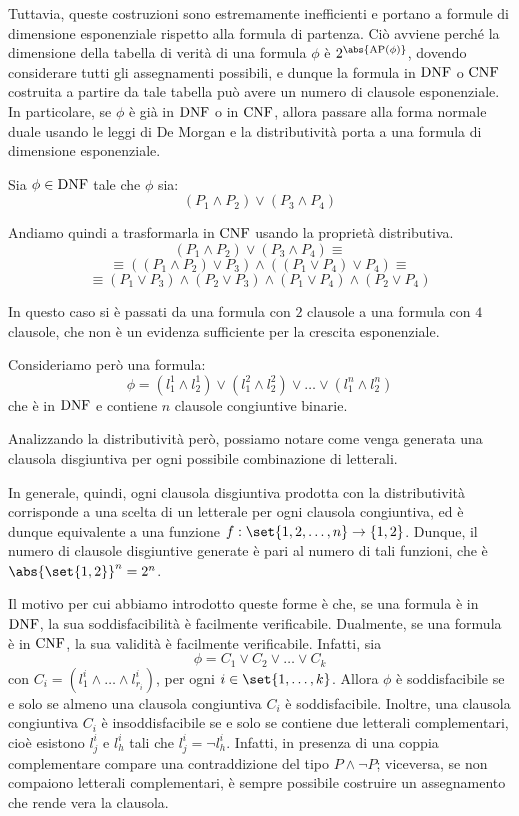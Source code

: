 Tuttavia, queste costruzioni sono estremamente inefficienti e portano a formule di dimensione esponenziale rispetto alla formula di partenza. 
Ciò avviene perché la dimensione della tabella di verità di una formula \(\phi\) è \(2^{\abs{\AP[\phi]}}\), dovendo considerare tutti gli assegnamenti possibili, e dunque la formula in \(\operatorname{DNF}\) o \(\operatorname{CNF}\) costruita a partire da tale tabella può avere un numero di clausole esponenziale. 
In particolare, se \(\phi\) è già in \(\operatorname{DNF}\) o in \(\operatorname{CNF}\), allora passare alla forma normale duale usando le leggi di De Morgan e la distributività porta a una formula di dimensione esponenziale.

\begin{example}{}
  Sia \(\phi \in\operatorname{DNF}\) tale che \(\phi\) sia:
  \[(P_1 \land P_2)\lor (P_3 \land P_4)\]

  Andiamo quindi a trasformarla in \(\operatorname{CNF}\) usando la proprietà distributiva.
  \[(P_1 \land P_2)\lor (P_3 \land P_4)\equiv\]
  \[\equiv ((P_1 \land P_2)\lor P_3)\land((P_1 \lor P_4)\lor P_4)\equiv\]
  \[\equiv (P_1 \lor P_3) \land (P_2 \lor P_3) \land (P_1 \lor P_4) \land (P_2 \lor P_4)\]

  In questo caso si è passati da una formula con \(2\) clausole a una formula con \(4\) clausole, che non è un evidenza sufficiente per la crescita esponenziale.

  Consideriamo però una formula:
  \[\phi = (l_1^1 \land l_2^1) \lor (l_1^2 \land l_2^2) \lor\ldots\lor (l_1^n \land l_2^n)\]
  che è in \(\operatorname{DNF}\) e contiene \(n\) clausole congiuntive binarie.

  Analizzando la distributività però, possiamo notare come venga generata una clausola disgiuntiva per ogni possibile combinazione di letterali.

  In generale, quindi, ogni clausola disgiuntiva prodotta con la distributività corrisponde a una scelta di un letterale per ogni clausola congiuntiva, ed è dunque equivalente a una funzione \(f:\set{1,2,\ldots,n} \to \{1,2\}\). Dunque, il numero di clausole disgiuntive generate è pari al numero di tali funzioni, che è \(\abs{\set{1,2}}^n = 2^n\).
\end{example}

Il motivo per cui abbiamo introdotto queste forme è che, se una formula è in \(\operatorname{DNF}\), la sua soddisfacibilità è facilmente verificabile. 
Dualmente, se una formula è in \(\operatorname{CNF}\), la sua validità è facilmente verificabile.
Infatti, sia
\[\phi = C_1 \lor C_2 \lor \ldots \lor C_k\]
con \(C_i = (l_1^i \land \ldots \land l_{r_i}^i)\), per ogni \(i \in \set{1,\ldots,k}\).
Allora \(\phi\) è soddisfacibile se e solo se almeno una clausola congiuntiva \(C_i\) è soddisfacibile.
Inoltre, una clausola congiuntiva \(C_i\) è insoddisfacibile se e solo se contiene due letterali complementari, cioè esistono \(l_j^i\) e \(l_h^i\) tali che \(l_j^i = \neg l_h^i\).
Infatti, in presenza di una coppia complementare compare una contraddizione del tipo \(P \land \neg P\); viceversa, se non compaiono letterali complementari, è sempre possibile costruire un assegnamento che rende vera la clausola.

